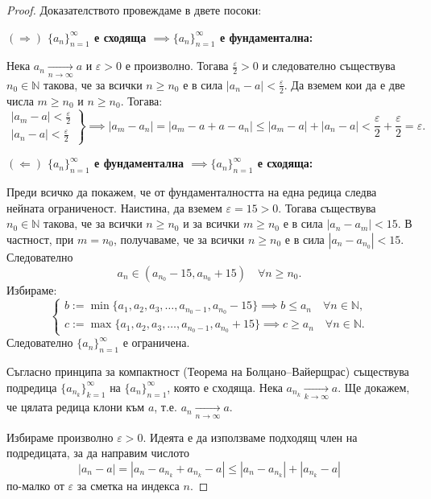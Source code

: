 \begin{proof}
Доказателството провеждаме в двете посоки:

$(\Rightarrow)$ \textbf{$\{a_n\}_{n=1}^{\infty}$ е сходяща $\implies \{a_n\}_{n=1}^{\infty}$ е фундаментална:}

Нека $a_n \xrightarrow[n\to\infty]{} a$ и $\varepsilon > 0$ е произволно. Тогава $\frac{\varepsilon}{2} > 0$ и следователно съществува $n_0 \in \mathbb{N}$ такова, че за всички $n \ge n_0$ е в сила $|a_n - a| < \frac{\varepsilon}{2}$. Да вземем кои да е две числа $m \ge n_0$ и $n \ge n_0$. Тогава:
\[
\left.
\begin{aligned}
|a_m - a| < \frac{\varepsilon}{2} \\
|a_n - a| < \frac{\varepsilon}{2}
\end{aligned}
\right\} \implies |a_m - a_n| = |a_m - a + a - a_n| \le |a_m - a| + |a_n - a| < \frac{\varepsilon}{2} + \frac{\varepsilon}{2} = \varepsilon.
\]

$(\Leftarrow)$ \textbf{$\{a_n\}_{n=1}^{\infty}$ е фундаментална $\implies \{a_n\}_{n=1}^{\infty}$ е сходяща:}

Преди всичко да покажем, че от фундаменталността на една редица следва нейната ограниченост. Наистина, да вземем $\varepsilon = 15 > 0$. Тогава съществува $n_0 \in \mathbb{N}$ такова, че за всички $n \ge n_0$ и за всички $m \ge n_0$ е в сила $|a_n - a_m| < 15$. В частност, при $m = n_0$, получаваме, че за всички $n \ge n_0$ е в сила $|a_n - a_{n_0}| < 15$. Следователно
\[
a_n \in (a_{n_0} - 15, a_{n_0} + 15) \quad \forall n \ge n_0.
\]
Избираме:
\[
\begin{cases}
b := \min \{a_1, a_2, a_3, \dots, a_{n_0-1}, a_{n_0} - 15\} \implies b \le a_n \quad \forall n \in \mathbb{N}, \\
c := \max \{a_1, a_2, a_3, \dots, a_{n_0-1}, a_{n_0} + 15\} \implies c \ge a_n \quad \forall n \in \mathbb{N}.
\end{cases}
\]
Следователно $\{a_n\}_{n=1}^{\infty}$ е ограничена.

Съгласно принципа за компактност (Теорема на Болцано--Вайерщрас) съществува подредица $\{a_{n_k}\}_{k=1}^{\infty}$ на $\{a_n\}_{n=1}^{\infty}$, която е сходяща. Нека $a_{n_k} \xrightarrow[k\to\infty]{} a$. Ще докажем, че цялата редица клони към $a$, т.е. $a_n \xrightarrow[n\to\infty]{} a$.

Избираме произволно $\varepsilon > 0$. Идеята е да използваме подходящ член на подредицата, за да направим числото
\[
|a_n - a| = |a_n - a_{n_k} + a_{n_k} - a| \le |a_n - a_{n_k}| + |a_{n_k} - a|
\]
по-малко от $\varepsilon$ за сметка на индекса $n$.


\end{proof}
